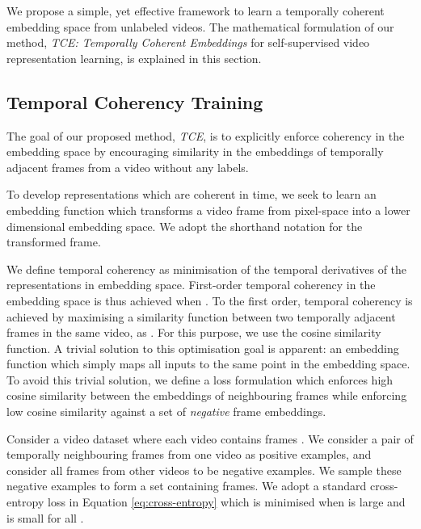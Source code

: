 \documentclass[a4paper,conference]{IEEEtran}
\begin{document}
We propose a simple, yet effective framework to learn a temporally coherent embedding space from unlabeled videos. The mathematical formulation of our method, \textit{TCE: Temporally Coherent Embeddings} for self-supervised video representation learning, is explained in this section.

\subsection{Temporal Coherency Training}
    
The goal of our proposed method, \textit{TCE}, is to explicitly enforce coherency in the embedding space by encouraging similarity in the embeddings of temporally adjacent frames from a video without any labels. 

To develop representations which are coherent in time, we seek to learn an embedding function  which transforms a video frame  from pixel-space into a lower dimensional embedding space. We adopt the shorthand notation  for the transformed frame.

We define temporal coherency as minimisation of the temporal derivatives of the representations in embedding space. First-order temporal coherency in the embedding space is thus achieved when . To the first order, temporal coherency is achieved by maximising a similarity function  between two temporally adjacent frames in the same video, as .  For this purpose, we use the cosine similarity function.
A trivial solution to this optimisation goal is apparent: an embedding function which simply maps all inputs to the same point in the embedding space. To avoid this trivial solution, we define a loss formulation which enforces high cosine similarity between the embeddings of neighbouring frames while enforcing low cosine similarity against a set of \textit{negative} frame embeddings.
















Consider a video dataset where each video  contains  frames . 
We consider a pair of temporally neighbouring frames from one video as positive examples, and consider all frames from other videos to be negative examples. We sample these negative examples to form a set  containing  frames. 
We adopt a standard cross-entropy loss in Equation \ref{eq:cross-entropy} which is minimised when  is large and  is small for all . 
\end{document}
